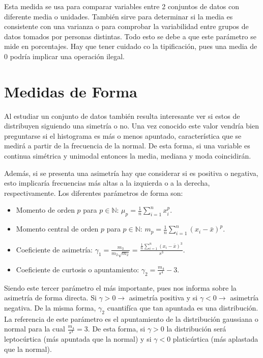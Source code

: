 \documentclass[10pt,a4paper]{book}
\begin{document}
Esta medida se usa para comparar variables entre 2 conjuntos de datos con diferente media o unidades. También sirve para determinar si la media es consistente con una varianza o para comprobar la variabilidad entre grupos de datos tomados por personas distintas. Todo esto se debe a que este parámetro se mide en porcentajes. Hay que tener cuidado co la tipificación, pues una media de $0$ podría implicar una operación ilegal. 

\section{Medidas de Forma}
Al estudiar un conjunto de datos también resulta interesante ver si estos de distribuyen siguiendo una simetría o no. Una vez conocido este valor vendría bien preguntarse si el histograma es más o menos apuntado, característica que se medirá a partir de la frecuencia de la normal. De esta forma, si una variable es continua simétrica y unimodal entonces la media, mediana y moda coincidirán.

Además, si se presenta una asimetría hay que considerar si es positiva o negativa, esto implicaría frecuencias más altas a la izquierda o a la derecha, respectivamente. Los diferentes parámetros de forma son: 
\begin{itemize}
	\item Momento de orden $p$ para $p\in\mathbb{N}$: $\mu_p=\frac1{n}\sum\limits_{i=1}^nx_i^p$.
	\item Momento central de orden $p$ para $p\in\mathbb{N}$: $m_p = \frac1{n}\sum\limits_{i=1}^n(x_i-\bar x)^p$.
	\item Coeficiente de asimetría: $\gamma_1= \frac{m_3}{m_2\sqrt{m_2}} = \frac{\frac{1}{n}\sum_{i=1}^n(x_i-\bar x)^3}{s^3}$.
	\item Coeficiente de curtosis o apuntamiento: $\gamma_2 = \frac{m_4}{s^4}-3$.
\end{itemize}
Siendo este tercer parámetro el más importante, pues nos informa sobre la asimetría de forma directa. Si $\gamma > 0\longrightarrow$ asimetría positiva y si $\gamma < 0\longrightarrow$ asimetría negativa. De la misma forma, $\gamma_2$ cuantifíca que tan apuntada es una distribución. La referencia de este parámetro es el apuntamiento de la distribución gaussiana o normal para la cual $\frac{m_4}{s^4} = 3$. De esta forma, si $\gamma >0$ la distribución será leptocúrtica (más apuntada que la normal) y si $\gamma<0$ platicúrtica (más aplastada que la normal).

\setcounter{chapter}{2}
\end{document}
